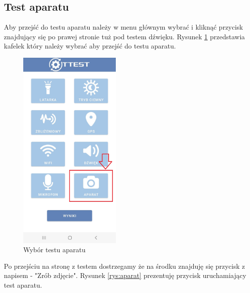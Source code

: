 \newpage


\subsection{Test aparatu}

\hspace{0.60cm}Aby przejść do testu aparatu należy w menu głównym wybrać i kliknąć przycisk znajdujący się po prawej stronie tuż pod testem dźwięku. Rysunek \ref{rys:menu7} przedstawia kafelek który należy wybrać aby przejść do testu aparatu.

\begin{figure}[!hbt]
	\begin{center}
		\includegraphics[angle=360, width=0.45\textwidth]{rys/punkt6/menu7}
		\caption{Wybór testu aparatu}
		\label{rys:menu7}
	\end{center}
\end{figure}

\newpage


Po przejściu na stronę z testem dostrzegamy że na środku znajduję się przycisk z napisem - "Zrób zdjęcie". Rysunek \ref{rys:aparat} prezentuję przycisk uruchamiający test aparatu.

